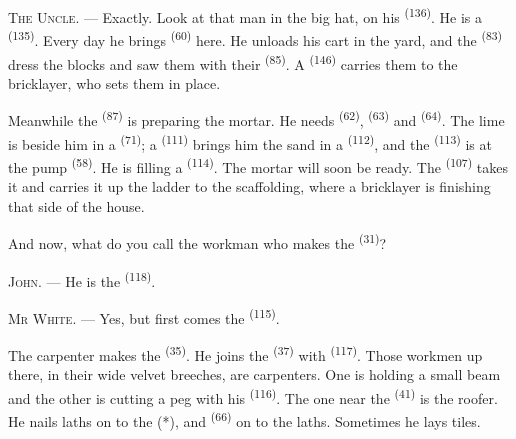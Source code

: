 \textsc{The Uncle}. --- Exactly. Look at that man in the big hat, on his
 \textsuperscript{(136)}. He is a  \textsuperscript{(135)}. Every
day he brings  \textsuperscript{(60)} here. He unloads his cart in the
yard, and the  \textsuperscript{(83)} dress the blocks and saw them with
their  \textsuperscript{(85)}. A
 \textsuperscript{(146)} carries them to the bricklayer, who sets
them in place.

Meanwhile the  \textsuperscript{(87)} is preparing the mortar. He needs
 \textsuperscript{(62)},  \textsuperscript{(63)} and
 \textsuperscript{(64)}. The lime is beside him in a 
\textsuperscript{(71)}; a  \textsuperscript{(111)} brings him the
sand in a  \textsuperscript{(112)}, and the 
\textsuperscript{(113)} is at the pump \textsuperscript{(58)}. He is filling a
 \textsuperscript{(114)}. The mortar will soon be ready. The
 \textsuperscript{(107)} takes it and carries it up the ladder
to the scaffolding, where a bricklayer is finishing that side of the house.

And now, what do you call the workman who makes the  \textsuperscript{(31)}?

\textsc{John}. --- He is the  \textsuperscript{(118)}.

\VUsaut{3.0mm}
\VUsaut{3.0mm}

\textsc{Mr White}. --- Yes, but first comes the  \textsuperscript{(115)}.

The carpenter makes the  \textsuperscript{(35)}. He joins the
 \textsuperscript{(37)} with  \textsuperscript{(117)}. Those
workmen up there, in their wide velvet breeches, are carpenters. One is holding a small beam
and the other is cutting a peg with his  \textsuperscript{(116)}. The one near the
 \textsuperscript{(41)} is the roofer. He nails laths on to the
 (*), and  \textsuperscript{(66)} on to the laths. Sometimes he
lays tiles.


